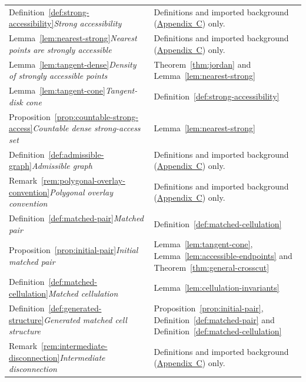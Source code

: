 \documentclass[11pt]{article}
\theoremstyle{mainplain}
\theoremstyle{mainroman}
\theoremstyle{definition}
\numberwithin{equation}{section}
\begin{document}
\begin{longtable}{@{}>{\raggedright\arraybackslash}p{}>{\raggedright\arraybackslash}p{}@{}}
Definition~\ref{def:strong-accessibility}\newline\emph{Strong accessibility} & Definitions and imported background (\hyperref[app:background]{Appendix~C}) only. \\
Lemma~\ref{lem:nearest-strong}\newline\emph{Nearest points are strongly accessible} & Definitions and imported background (\hyperref[app:background]{Appendix~C}) only. \\
Lemma~\ref{lem:tangent-dense}\newline\emph{Density of strongly accessible points} & Theorem~\ref{thm:jordan} and Lemma~\ref{lem:nearest-strong} \\
Lemma~\ref{lem:tangent-cone}\newline\emph{Tangent-disk cone} & Definition~\ref{def:strong-accessibility} \\
Proposition~\ref{prop:countable-strong-access}\newline\emph{Countable dense strong-access set} & Lemma~\ref{lem:nearest-strong} \\
Definition~\ref{def:admissible-graph}\newline\emph{Admissible graph} & Definitions and imported background (\hyperref[app:background]{Appendix~C}) only. \\
Remark~\ref{rem:polygonal-overlay-convention}\newline\emph{Polygonal overlay convention} & Definitions and imported background (\hyperref[app:background]{Appendix~C}) only. \\
Definition~\ref{def:matched-pair}\newline\emph{Matched pair} & Definition~\ref{def:matched-cellulation} \\
Proposition~\ref{prop:initial-pair}\newline\emph{Initial matched pair} & Lemma~\ref{lem:tangent-cone}, Lemma~\ref{lem:accessible-endpoints} and Theorem~\ref{thm:general-crosscut} \\
Definition~\ref{def:matched-cellulation}\newline\emph{Matched cellulation} & Lemma~\ref{lem:cellulation-invariants} \\
Definition~\ref{def:generated-structure}\newline\emph{Generated matched cell structure} & Proposition~\ref{prop:initial-pair}, Definition~\ref{def:matched-pair} and Definition~\ref{def:matched-cellulation} \\
Remark~\ref{rem:intermediate-disconnection}\newline\emph{Intermediate disconnection} & Definitions and imported background (\hyperref[app:background]{Appendix~C}) only. \\

\end{longtable}
\end{document}
